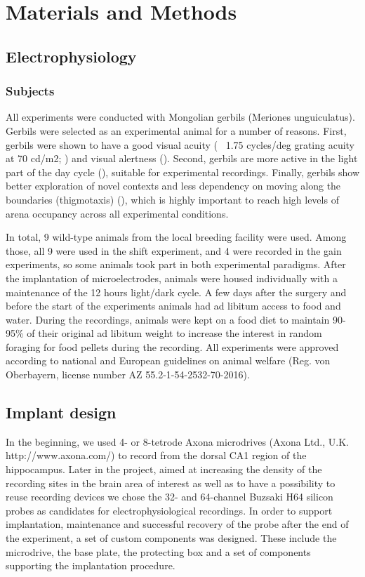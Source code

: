 \chapter{Materials and Methods}
\label{ch:methods}

\section{Electrophysiology}
\label{sec:ephys}

\subsection{Subjects}

All experiments were conducted with Mongolian gerbils (Meriones unguiculatus). Gerbils were selected as an experimental animal for a number of reasons. First, gerbils were shown to have a good visual acuity (~ 1.75 cycles/deg grating acuity at 70 cd/m2; \cite{Baker1983}) and visual alertness (\cite{Ingle1981}). Second, gerbils are more active in the light part of the day cycle (\cite{Naumov1975}), suitable for experimental recordings. Finally, gerbils show better exploration of novel contexts and less dependency on moving along the boundaries (thigmotaxis) (\cite{STUERMER2003249}), which is highly important to reach high levels of arena occupancy across all experimental conditions.

In total, 9 wild-type animals from the local breeding facility were used. Among those, all 9 were used in the shift experiment, and 4 were recorded in the gain experiments, so some animals took part in both experimental paradigms. After the implantation of microelectrodes, animals were housed individually with a maintenance of the 12 hours light/dark cycle. A few days after the surgery and before the start of the experiments animals had ad libitum access to food and water. During the recordings, animals were kept on a food diet to maintain 90-95\% of their original ad libitum weight to increase the interest in random foraging for food pellets during the recording. All experiments were approved according to national and European guidelines on animal welfare (Reg. von Oberbayern, license number AZ 55.2-1-54-2532-70-2016).


\section{Implant design}
\label{sec:implant_design}

In the beginning, we used 4- or 8-tetrode Axona microdrives (Axona Ltd., U.K. http://www.axona.com/) to record from the dorsal CA1 region of the hippocampus. Later in the project, aimed at increasing the density of the recording sites in the brain area of interest as well as to have a possibility to reuse recording devices we chose the 32- and 64-channel Buzsaki H64 silicon probes as candidates for electrophysiological recordings. In order to support implantation, maintenance and successful recovery of the probe after the end of the experiment, a set of custom components was designed. These include the microdrive, the base plate, the protecting box and a set of components supporting the implantation procedure.

